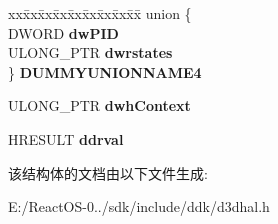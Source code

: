 \begin{DoxyCompactItemize}
\begin{tabbing}
\end{tabbing}\item 
\mbox{\label{struct___d3_d_h_a_l___c_o_n_t_e_x_t_c_r_e_a_t_e_d_a_t_a_a68d9b3fabce28713839c5b595c1fb6a6}} 
\begin{tabbing}
xx\=xx\=xx\=xx\=xx\=xx\=xx\=xx\=xx\=\kill
union \{\\
\>DWORD {\bfseries dwPID}\\
\>ULONG\_PTR {\bfseries dwrstates}\\
\} {\bfseries DUMMYUNIONNAME4}\\

\end{tabbing}\item 
\mbox{\label{struct___d3_d_h_a_l___c_o_n_t_e_x_t_c_r_e_a_t_e_d_a_t_a_ac785bb1a37995a5c4f7b4df83e738ab1}} 
U\+L\+O\+N\+G\+\_\+\+P\+TR {\bfseries dwh\+Context}
\item 
\mbox{\label{struct___d3_d_h_a_l___c_o_n_t_e_x_t_c_r_e_a_t_e_d_a_t_a_a8a6d2727dce157760392d9f1dc302964}} 
H\+R\+E\+S\+U\+LT {\bfseries ddrval}
\end{DoxyCompactItemize}


该结构体的文档由以下文件生成\+:\begin{DoxyCompactItemize}
\item 
E\+:/\+React\+O\+S-\/0../sdk/include/ddk/d3dhal.\+h\end{DoxyCompactItemize}
